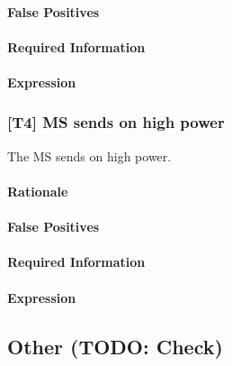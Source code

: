 \documentclass[a4paper,11pt,notitlepage,bigheadings,oneside]{scrartcl}
\begin{document}
\TBD{}

\paragraph{False Positives}

\TBD{}

\paragraph{Required Information}

\TBD{}

\paragraph{Expression}

\TBD{}


\subsubsection{[T4] MS sends on high power}

The MS sends on high power.

\paragraph{Rationale}

\TBD{}

\paragraph{False Positives}

\TBD{}

\paragraph{Required Information}

\TBD{}

\paragraph{Expression}

\TBD{}


\subsection{Other (TODO: Check)}
\end{document}
